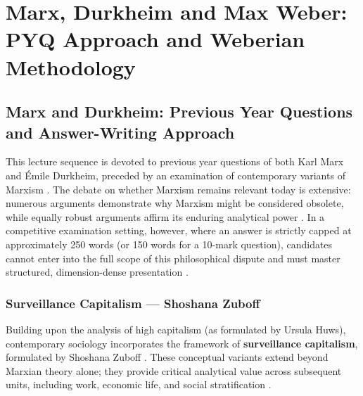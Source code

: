 \chapter{Marx, Durkheim and Max Weber: PYQ Approach and Weberian Methodology}


\section{Marx and Durkheim: Previous Year Questions and Answer-Writing Approach}

This lecture sequence is devoted to previous year questions of both Karl Marx and \'Emile Durkheim, preceded by an examination of contemporary variants of Marxism . The debate on whether Marxism remains relevant today is extensive: numerous arguments demonstrate why Marxism might be considered obsolete, while equally robust arguments affirm its enduring analytical power . In a competitive examination setting, however, where an answer is strictly capped at approximately 250 words (or 150 words for a 10-mark question), candidates cannot enter into the full scope of this philosophical dispute and must master structured, dimension-dense presentation .

\subsection{Surveillance Capitalism --- Shoshana Zuboff}

Building upon the analysis of high capitalism (as formulated by Ursula Huws), contemporary sociology incorporates the framework of \textbf{surveillance capitalism}, formulated by Shoshana Zuboff . These conceptual variants extend beyond Marxian theory alone; they provide critical analytical value across subsequent units, including work, economic life, and social stratification .

